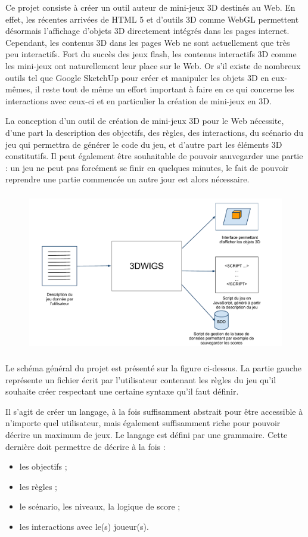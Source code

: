 Ce projet consiste à créer un outil auteur de mini-jeux 3D destinés au Web.
En effet, les récentes arrivées de HTML 5 et d'outils 3D comme WebGL permettent désormais l'affichage d'objets 3D directement
intégrés dans les pages internet.
Cependant, les contenus 3D dans les pages Web ne sont actuellement que très peu interactifs.
Fort du succès des jeux flash, les contenus interactifs 3D comme les mini-jeux ont naturellement leur place sur le Web.
Or s'il existe de nombreux outils tel que Google SketchUp pour créer et manipuler les objets 3D en eux-mêmes,
il reste tout de même un effort important à faire en ce qui concerne les interactions avec ceux-ci et en particulier la création de mini-jeux en 3D.

\vspace{0.5cm}

La conception d'un outil de création de mini-jeux 3D pour le Web nécessite, d'une part la description des objectifs, des règles, des interactions, 
du scénario du jeu qui permettra de générer le code du jeu, et d'autre part les éléments 3D constitutifs.
Il peut également être souhaitable de pouvoir sauvegarder une partie :
un jeu ne peut pas forcément se finir en quelques minutes, le fait de pouvoir reprendre une partie commencée un autre jour est alors nécessaire.

\begin{figure}[h]
 \centering
 \includegraphics[height=7cm]{img/schema_general}
 \label{fig:schemaprojet}
\end{figure}

Le schéma général du projet est présenté sur la figure ci-dessus.
La partie gauche représente un fichier écrit par l'utilisateur contenant les règles du jeu qu'il souhaite créer respectant
une certaine syntaxe qu'il faut définir.

Il s'agit de créer un langage, à la fois suffisamment abstrait pour être accessible à n'importe quel utilisateur, mais également suffisamment riche
pour pouvoir décrire un maximum de jeux.
Le langage est défini par une grammaire.
Cette dernière doit permettre de décrire à la fois :
\begin{itemize}
 \item les objectifs ;
 \item les règles ;
 \item le scénario, les niveaux, la logique de score ;
 \item les interactions avec le(s) joueur(s).
\end{itemize}

